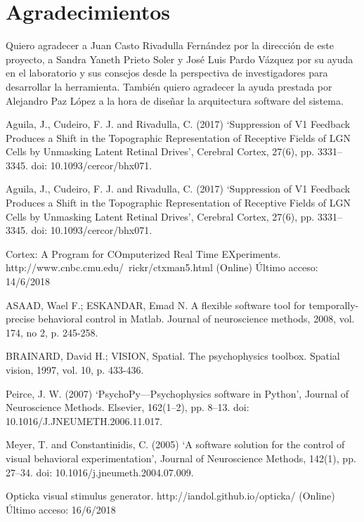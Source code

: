 \documentclass[conference]{IEEEtran}
\begin{document}
\section{Agradecimientos}

Quiero agradecer a Juan Casto Rivadulla Fernández por la dirección de este proyecto, a Sandra Yaneth Prieto Soler y José Luis Pardo Vázquez por su ayuda en el laboratorio y sus consejos desde la perspectiva de investigadores para desarrollar la herramienta. 
También quiero agradecer la ayuda prestada por Alejandro Paz López a la hora de diseñar la arquitectura software del sistema.

\begin{thebibliography}{00}
 Aguila, J., Cudeiro, F. J. and Rivadulla, C. (2017) ‘Suppression of V1 Feedback Produces a Shift in the Topographic Representation of Receptive Fields of LGN Cells by Unmasking Latent Retinal Drives’, Cerebral Cortex, 27(6), pp. 3331–3345. doi: 10.1093/cercor/bhx071.

 Aguila, J., Cudeiro, F. J. and Rivadulla, C. (2017) ‘Suppression of V1 Feedback Produces a Shift in the Topographic Representation of Receptive Fields of LGN Cells by Unmasking Latent Retinal Drives’, Cerebral Cortex, 27(6), pp. 3331–3345. doi: 10.1093/cercor/bhx071.

 Cortex: A Program for COmputerized Real Time EXperiments. http://www.cnbc.cmu.edu/~rickr/ctxman5.html (Online) Último acceso: 14/6/2018


ASAAD, Wael F.; ESKANDAR, Emad N. A flexible software tool for temporally-precise behavioral control in Matlab. Journal of neuroscience methods, 2008, vol. 174, no 2, p. 245-258.


 BRAINARD, David H.; VISION, Spatial. The psychophysics toolbox. Spatial vision, 1997, vol. 10, p. 433-436.

 Peirce, J. W. (2007) ‘PsychoPy—Psychophysics software in Python’, Journal of Neuroscience Methods. Elsevier, 162(1–2), pp. 8–13. doi: 10.1016/J.JNEUMETH.2006.11.017.

 Meyer, T. and Constantinidis, C. (2005) ‘A software solution for the control of visual behavioral experimentation’, Journal of Neuroscience Methods, 142(1), pp. 27–34. doi: 10.1016/j.jneumeth.2004.07.009.

 Opticka visual stimulus generator. http://iandol.github.io/opticka/ (Online) Último acceso: 16/6/2018



\end{thebibliography}
\end{document}
